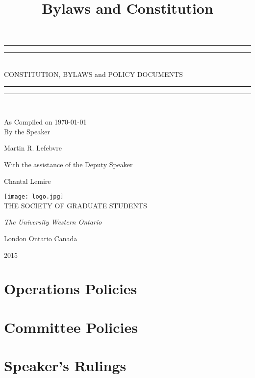 \documentclass[12pt,letterpaper]{book}
\title{Bylaws and Constitution}
\newcommand*{\titleGP}{\begingroup %
\centering %
\vspace*{\baselineskip} %

\rule{\textwidth}{1.6pt}\vspace*{-\baselineskip}\vspace*{2pt} %
\rule{\textwidth}{0.4pt}\\[\baselineskip] %

{\LARGE CONSTITUTION, BYLAWS} 
and
{\LARGE POLICY DOCUMENTS}

\rule{\textwidth}{0.4pt}\vspace*{-\baselineskip}\vspace{3.2pt} %
\rule{\textwidth}{1.6pt}\\[\baselineskip] %



\vspace*{2\baselineskip} %

As Compiled on \today \\[\baselineskip]
By the Speaker


{\Large Martin R. Lefebvre\par} %
\vspace*{\baselineskip} %

With the assistance of the Deputy Speaker
{\large Chantal Lemire \par}


\vfill %

\texttt{[image: logo.jpg]}\\[1cm]


{\large THE SOCIETY OF GRADUATE STUDENTS}\par %
\scshape %
{\itshape The University Western Ontario\par} %
London Ontario Canada\par %
{\scshape 2015} \\[0.3\baselineskip] %
\endgroup}
\begin{document}
 

\pagestyle{empty} %

\titleGP %

\tableofcontents %
\pagebreak %
\pagestyle{plain}





%

%



\chapter{Operations Policies}

 
 
 
 

 \chapter{Committee Policies}
 
 

\chapter{Speaker's Rulings}



\newpage
 
%
\printindex
\end{document}
